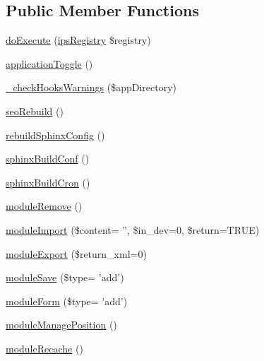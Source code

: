 \subsection*{Public Member Functions}
\begin{DoxyCompactItemize}
\item 
\hyperlink{classadmin__core__applications__applications_afbc4e912a0604b94d47d66744c64d8ba}{do\-Execute} (\hyperlink{classips_registry}{ips\-Registry} \$registry)
\item 
\hyperlink{classadmin__core__applications__applications_aa1c508884ac503ad2afd13710f8b45fa}{application\-Toggle} ()
\item 
\hyperlink{classadmin__core__applications__applications_af55e631df528321e940d982fc87a4bee}{\-\_\-check\-Hooks\-Warnings} (\$app\-Directory)
\item 
\hyperlink{classadmin__core__applications__applications_a18df0eee1af1900c1ca3a56de43ecf50}{seo\-Rebuild} ()
\item 
\hyperlink{classadmin__core__applications__applications_a733d2c7f2a57f17663eb821d31ce40c9}{rebuild\-Sphinx\-Config} ()
\item 
\hyperlink{classadmin__core__applications__applications_a71509c50da265e46ff70b6a16bd08ab4}{sphinx\-Build\-Conf} ()
\item 
\hyperlink{classadmin__core__applications__applications_ac1aaa490df0b5eb39c3b02c032ea35a0}{sphinx\-Build\-Cron} ()
\item 
\hyperlink{classadmin__core__applications__applications_adf76aba54c0fdd33871beaad3a1281d7}{module\-Remove} ()
\item 
\hyperlink{classadmin__core__applications__applications_a68ef311c9314b8d7d397e5145e381bde}{module\-Import} (\$content= '', \$in\-\_\-dev=0, \$return=T\-R\-U\-E)
\item 
\hyperlink{classadmin__core__applications__applications_a45dfcb60d326c45e678eab2932165ffd}{module\-Export} (\$return\-\_\-xml=0)
\item 
\hyperlink{classadmin__core__applications__applications_a748b82578fb4dfa671bc105d2bb6e1be}{module\-Save} (\$type= 'add')
\item 
\hyperlink{classadmin__core__applications__applications_a6e27412c04cced2ca1dba625cacae73f}{module\-Form} (\$type= 'add')
\item 
\hyperlink{classadmin__core__applications__applications_a9a6542f976b99f90420abbf8787213c5}{module\-Manage\-Position} ()
\item 
\hyperlink{classadmin__core__applications__applications_a5472a084f2113c13dc9672bc37fbc62a}{module\-Recache} ()

\end{DoxyCompactItemize}
